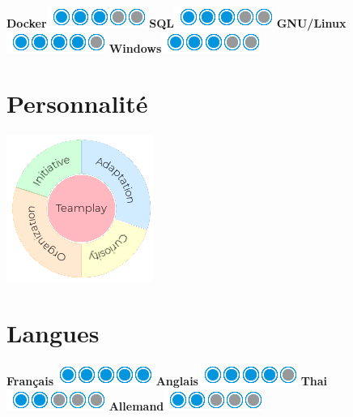 \documentclass[]{friggeri-cv}
\begin{document}
\begin{aside}
    \textbf{Docker}\includegraphics[scale=0.40]{img/3puces.png}
    \textbf{SQL}\includegraphics[scale=0.40]{img/3puces.png}
    \textbf{GNU/Linux}\includegraphics[scale=0.40]{img/4puces.png}
    \textbf{Windows}\includegraphics[scale=0.40]{img/3puces.png}
    ~
  \section{Personnalité}
  \hspace{1cm}
    \includegraphics[scale=0.62]{img/personal.png}
    ~
  \section{Langues}
  \hspace{1cm}
    \textbf{Français}\includegraphics[scale=0.40]{img/5puces.png}
    \textbf{Anglais}\includegraphics[scale=0.40]{img/4puces.png}
    \textbf{Thai}\includegraphics[scale=0.40]{img/2puces.png}
    \textbf{Allemand}\includegraphics[scale=0.40]{img/2puces.png}
\end{aside}
\end{document}

